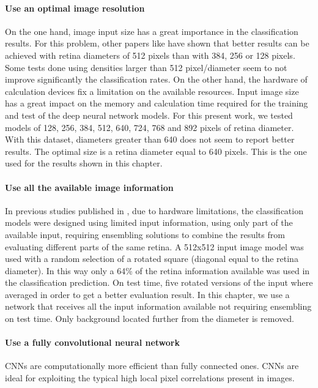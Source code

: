 \paragraph{Use an optimal image resolution} On the one hand, image input size has a great importance in the classification results. For this problem, other papers like \citep{jdelatorre2016} have shown that better results can be achieved with retina diameters of 512 pixels than with 384, 256 or 128 pixels. Some tests done using densities larger than 512 pixel/diameter seem to not improve significantly the classification rates. On the other hand, the hardware of calculation devices fix a limitation on the available resources. Input image size has a great impact on the memory and calculation time required for the training and test of the deep neural network models. For this present work, we tested models of 128, 256, 384, 512, 640, 724, 768 and 892 pixels of retina diameter. With this dataset, diameters greater than 640 does not seem to report better results. The optimal size is a retina diameter equal to 640 pixels. This is the one used for the results shown in this chapter.

\paragraph{Use all the available image information} In previous studies published in \citep{jdelatorre2016}, due to hardware limitations, the classification models were designed using limited input information, using only part of the available input, requiring ensembling solutions to combine the results from evaluating different parts of the same retina. A 512x512 input image model was used with a random selection of a rotated square (diagonal equal to the retina diameter). In this way only a 64\% of the retina information available was used in the classification prediction. On test time, five rotated versions of the input where averaged in order to get a better evaluation result. In this chapter, we use a network that receives all the input information available not requiring ensembling on test time. Only background located further from the diameter is removed.

\paragraph{Use a fully convolutional neural network} CNNs are computationally more efficient than fully connected ones. CNNs are ideal for exploiting the typical high local pixel correlations present in images.

